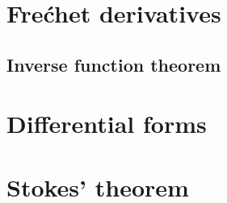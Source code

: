 \documentclass{../note}
\begin{document}
\chapter{Fre\'chet derivatives}


\section{Inverse function theorem}


\chapter{Differential forms}

\chapter{Stokes' theorem}
\end{document}
